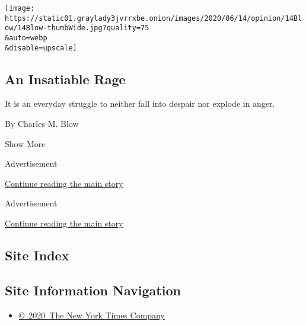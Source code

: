 \begin{enumerate}
  \texttt{[image: https://static01.graylady3jvrrxbe.onion/images/2020/06/14/opinion/14Blow/14Blow-thumbWide.jpg?quality=75\\\&auto=webp\\\&disable=upscale]}

  \hypertarget{an-insatiable-rage}{%
  \subsection{An Insatiable Rage}\label{an-insatiable-rage}}

  It is an everyday struggle to neither fall into despair nor explode in
  anger.

  By Charles M. Blow
\end{enumerate}

Show More

Advertisement

\protect\hyperlink{after-mid1}{Continue reading the main story}

Advertisement

\protect\hyperlink{after-mktg}{Continue reading the main story}

\hypertarget{site-index}{%
\subsection{Site Index}\label{site-index}}

\hypertarget{site-information-navigation}{%
\subsection{Site Information
Navigation}\label{site-information-navigation}}

\begin{itemize}
\tightlist
\item
  \href{https://help.nytimes3xbfgragh.onion/hc/en-us/articles/115014792127-Copyright-notice}{©~2020~The
  New York Times Company}
\end{itemize}

